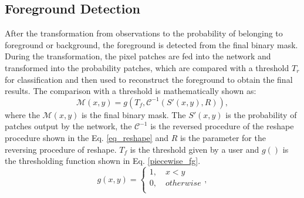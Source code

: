 \documentclass[journal]{IEEEtran}
\newcommand{\reffig}[1]{Fig. \ref{#1}}
\newcommand{\refeq}[1]{Eq. \ref{#1}}
\begin{document}
\subsection{Foreground Detection}
After the transformation from observations to the probability of belonging to foreground or background,
the foreground is detected from the final binary mask.
%
During the transformation,
the pixel patches are fed into the network and transformed into the probability patches,
which are compared with a threshold $T_r$ for classification and then used to reconstruct the foreground to obtain the final results.
%
The comparison with a threshold is mathematically shown as:
\begin{equation}
    \mathcal{M}(x,y) = g(T_f, \mathcal{C}^{-1}(S'(x,y), R)),
\end{equation}
where the $\mathcal{M}(x,y)$ is the final binary mask.
%
The $S'(x,y)$ is the probability of patches output by the network,
the $\mathcal{C}^{-1}$ is the reversed procedure of the reshape procedure shown in the \refeq{eq_reshape} and $R$ is the parameter for the reversing procedure of reshape.
%
$T_f$ is the threshold given by a user and $g()$ is the thresholding function shown in \refeq{piecewise_fg}.
% 
% 
% 
% 
% 
\begin{equation}
    \label{piecewise_fg}
    g(x,y) =
 \begin{cases}
  1,  \quad x < y       \\
  0,  \quad otherwise   \\
\end{cases},
\end{equation}
%


\end{document}
